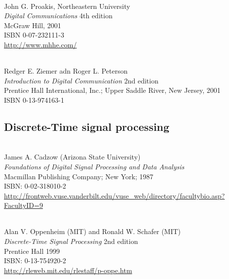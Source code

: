 \begin{thebibliography}{9}
\hspace{1pt}                      \\
   John G. Proakis, Northeastern University   \\   
   {\em Digital Communications} 4th edition   \\
   McGraw Hill, 2001                          \\
   ISBN 0-07-232111-3                         \\
   \url{http://www.mhhe.com/}                 

\hspace{1pt}                      \\
   Redger E. Ziemer adn Roger L. Peterson \\
   {\em Introduction to Digital Communication} 2nd edition \\
   Prentice Hall International, Inc.; Upper Saddle River, New Jersey, 2001 \\
   ISBN 0-13-974163-1

\subsection*{Discrete-Time signal processing}
\hspace{1pt}\\
   James A. Cadzow (Arizona State University) \\
   {\em Foundations of Digital Signal Processing and Data Analysis} \\
   Macmillan Publishing Company; New York; 1987 \\
   ISBN: 0-02-318010-2 \\
   \url{http://frontweb.vuse.vanderbilt.edu/vuse\_web/directory/facultybio.asp?FacultyID=9}

 \hspace{1pt}\\
   Alan V. Oppenheim (MIT) and Ronald W. Schafer (MIT) \\
   {\em Discrete-Time Signal Processing } 2nd edition \\
   Prentice Hall 1999     \\
   ISBN: 0-13-754920-2 \\
   \url{http://rleweb.mit.edu/rlestaff/p-oppe.htm}


\end{thebibliography}
